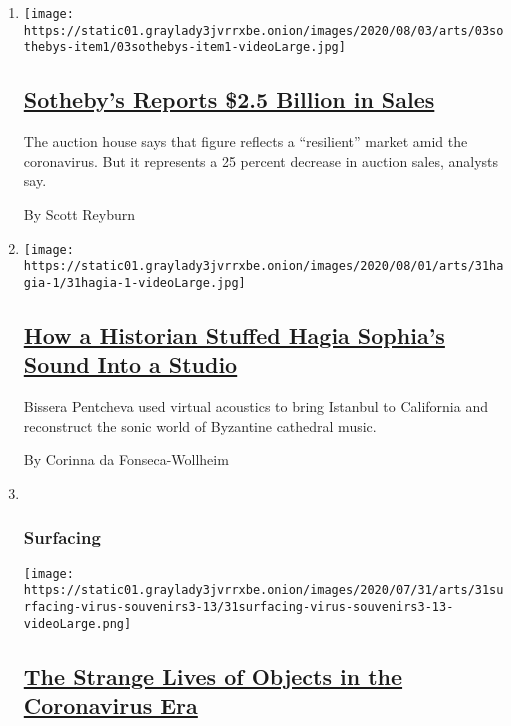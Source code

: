 \begin{enumerate}
\def\labelenumi{\arabic{enumi}.}
\item
  \texttt{[image: https://static01.graylady3jvrrxbe.onion/images/2020/08/03/arts/03sothebys-item1/03sothebys-item1-videoLarge.jpg]}

  \hypertarget{sothebys-reports-25-billion-in-sales}{%
  \subsection{\texorpdfstring{\href{/2020/08/03/arts/design/sothebys-sales.html}{Sotheby's
  Reports \$2.5 Billion in
  Sales}}{Sotheby's Reports \$2.5 Billion in Sales}}\label{sothebys-reports-25-billion-in-sales}}

  The auction house says that figure reflects a ``resilient'' market
  amid the coronavirus. But it represents a 25 percent decrease in
  auction sales, analysts say.

  By Scott Reyburn
\item
  \texttt{[image: https://static01.graylady3jvrrxbe.onion/images/2020/08/01/arts/31hagia-1/31hagia-1-videoLarge.jpg]}

  \hypertarget{how-a-historian-stuffed-hagia-sophias-sound-into-a-studio}{%
  \subsection{\texorpdfstring{\href{/2020/07/30/arts/music/hagia-sophia-acoustics-music.html}{How
  a Historian Stuffed Hagia Sophia's Sound Into a
  Studio}}{How a Historian Stuffed Hagia Sophia's Sound Into a Studio}}\label{how-a-historian-stuffed-hagia-sophias-sound-into-a-studio}}

  Bissera Pentcheva used virtual acoustics to bring Istanbul to
  California and reconstruct the sonic world of Byzantine cathedral
  music.

  By Corinna da Fonseca-Wollheim
\item ~
  \hypertarget{surfacing}{%
  \subsubsection{Surfacing}\label{surfacing}}

  \texttt{[image: https://static01.graylady3jvrrxbe.onion/images/2020/07/31/arts/31surfacing-virus-souvenirs3-13/31surfacing-virus-souvenirs3-13-videoLarge.png]}

  \hypertarget{the-strange-lives-of-objects-in-the-coronavirus-era}{%
  \subsection{\texorpdfstring{\href{/2020/08/01/arts/design/virus-design-objects.html}{The
  Strange Lives of Objects in the Coronavirus
  Era}}{The Strange Lives of Objects in the Coronavirus Era}}\label{the-strange-lives-of-objects-in-the-coronavirus-era}}


\end{enumerate}
